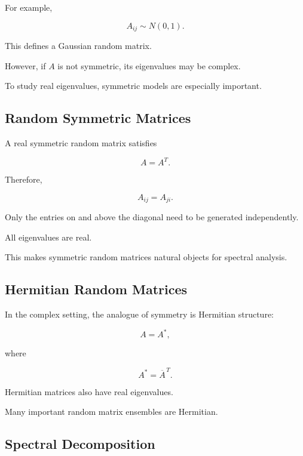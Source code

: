 For example,

\[
A_{ij}
\sim
N(0,1).
\]

This defines a Gaussian random matrix.

However, if \(A\) is not symmetric, its eigenvalues may be complex.

To study real eigenvalues, symmetric models are especially important.

\subsection{Random Symmetric Matrices}
\label{subsec:random-symmetric-matrices}

A real symmetric random matrix satisfies

\[
\boxed{
A=A^T.
}
\]

Therefore,

\[
A_{ij}=A_{ji}.
\]

Only the entries on and above the diagonal need to be generated
independently.

All eigenvalues are real.

This makes symmetric random matrices natural objects for spectral
analysis.

\subsection{Hermitian Random Matrices}
\label{subsec:hermitian-random-matrices}

In the complex setting, the analogue of symmetry is Hermitian
structure:

\[
\boxed{
A=A^*,
}
\]

where

\[
A^*
=
\overline{A}^{\,T}.
\]

Hermitian matrices also have real eigenvalues.

Many important random matrix ensembles are Hermitian.

\subsection{Spectral Decomposition}
\label{subsec:random-spectral-decomposition}

